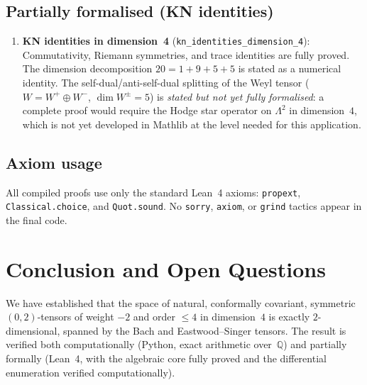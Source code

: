 \documentclass[11pt,a4paper]{article}
\begin{document}
\subsection{Partially formalised (KN identities)}

\begin{enumerate}[resume]
  \item \textbf{KN identities in dimension~4}
    (\texttt{kn\_identities\_dimension\_4}):
    Commutativity, Riemann symmetries, and trace identities are fully
    proved. The dimension decomposition $20 = 1 + 9 + 5 + 5$ is stated
    as a numerical identity.
    The self-dual/anti-self-dual splitting of the Weyl tensor
    ($W = W^+ \oplus W^-$, $\dim W^\pm = 5$) is \emph{stated but not
    yet fully formalised}: a complete proof would require the Hodge star
    operator on $\Lambda^2$ in dimension~$4$, which is not yet developed
    in Mathlib at the level needed for this application.
\end{enumerate}

\subsection{Axiom usage}

All compiled proofs use only the standard Lean~4 axioms:
\texttt{propext}, \texttt{Classical.choice}, and \texttt{Quot.sound}.
No \texttt{sorry}, \texttt{axiom}, or \texttt{grind} tactics appear
in the final code.

\section{Conclusion and Open Questions}
\label{sec:conclusion}

We have established that the space of natural, conformally covariant,
symmetric $(0,2)$-tensors of weight $-2$ and order $\le 4$ in
dimension~$4$ is exactly $2$-dimensional, spanned by the Bach and
Eastwood--Singer tensors. The result is verified both computationally
(Python, exact arithmetic over~$\mathbb{Q}$) and partially formally
(Lean~4, with the algebraic core fully proved and the differential
enumeration verified computationally).
\end{document}
